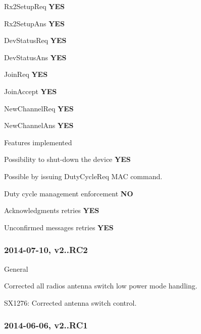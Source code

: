 \begin{DoxyItemize}
\begin{DoxyEnumerate}
\begin{DoxyItemize}
\item Rx2\+Setup\+Req {\bfseries Y\+ES}
\item Rx2\+Setup\+Ans {\bfseries Y\+ES}
\item Dev\+Status\+Req {\bfseries Y\+ES}
\item Dev\+Status\+Ans {\bfseries Y\+ES}
\item Join\+Req {\bfseries Y\+ES}
\item Join\+Accept {\bfseries Y\+ES}
\item New\+Channel\+Req {\bfseries Y\+ES}
\item New\+Channel\+Ans {\bfseries Y\+ES}
\end{DoxyItemize}
\item Features implemented
\begin{DoxyItemize}
\item Possibility to shut-\/down the device {\bfseries Y\+ES}

Possible by issuing Duty\+Cycle\+Req M\+AC command.
\item Duty cycle management enforcement {\bfseries NO}
\item Acknowledgments retries {\bfseries Y\+ES}
\item Unconfirmed messages retries {\bfseries Y\+ES}
\end{DoxyItemize}
\end{DoxyEnumerate}
\end{DoxyItemize}

\subsubsection*{2014-\/07-\/10, v2..\+R\+C2}


\begin{DoxyItemize}
\item General
\begin{DoxyEnumerate}
\item Corrected all radios antenna switch low power mode handling.
\item S\+X1276\+: Corrected antenna switch control.
\end{DoxyEnumerate}
\end{DoxyItemize}

\subsubsection*{2014-\/06-\/06, v2..\+R\+C1}


